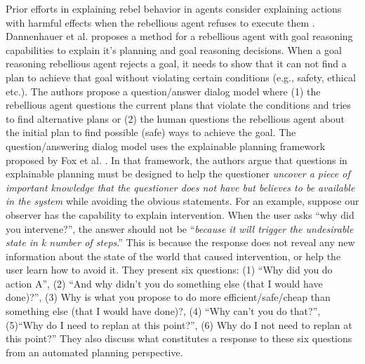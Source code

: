Prior efforts in explaining rebel behavior in agents consider explaining actions with harmful effects when the rebellious agent refuses to execute them \cite{briggs2015,greggsmith2015}.
Dannenhauer et al. \citeyear{dannenhauer2018explaining} proposes a method for a rebellious agent with goal reasoning capabilities to explain it's planning and goal reasoning decisions. 
When a goal reasoning rebellious agent rejects a goal, it needs to show that it can not find a plan to achieve that goal without violating certain conditions (e.g., safety, ethical etc.).
The authors propose a question/answer dialog model where (1) the rebellious agent questions the current plans that violate the conditions and tries to find alternative plans or (2) the human questions the rebellious agent about the initial plan to find possible (safe) ways to achieve the goal.
The question/answering dialog model uses the explainable planning framework proposed by Fox et al. \cite{fox2017xai}.
In that framework, the authors argue that questions in explainable planning must be designed to help the questioner \textit{uncover a piece of important knowledge that the questioner does not have but believes to be available in the system} while avoiding the obvious statements.  
For an example, suppose our observer has the capability to explain intervention. 
When the user asks ``why did you intervene?'', the answer should not be ``\textit{because it will trigger the undesirable state in k number of steps}.''
This is because the response does not reveal any new information about the state of the world that caused intervention, or help the user learn how to avoid it.
They present six questions: (1) ``Why did you do action A'', (2) ``And why didn’t you do something else (that I would have done)?'', (3) Why   is   what   you   propose   to   do   more   efficient/safe/cheap than something else (that I would have done)?, (4) ``Why can’t you do that?'', (5)``Why do I need to replan at this point?'', (6) Why do I not need to replan at this point?''
They also discuss what constitutes a response to these six questions from an automated planning perspective.


